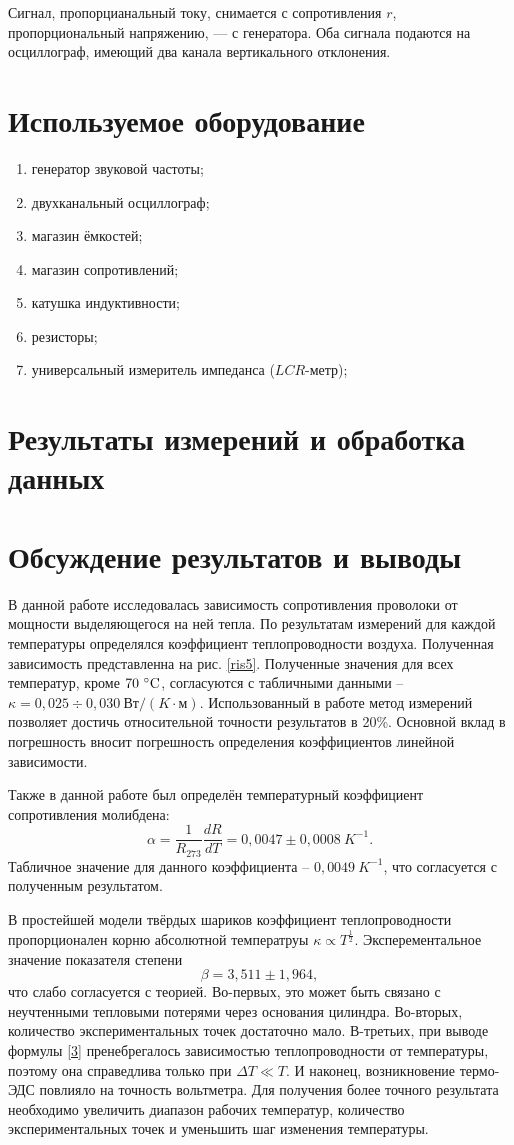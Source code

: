\documentclass[a4paper, 12pt]{article}
\begin{document}
Сигнал, пропорцианальный току, снимается с сопротивления $r$, пропорциональный напряжению, --- с генератора. Оба сигнала подаются на осциллограф, имеющий два канала вертикального отклонения.

\section{Используемое оборудование}

\begin{enumerate}
    \item генератор звуковой частоты;
    \item двухканальный осциллограф;
    \item магазин ёмкостей;
    \item магазин сопротивлений;
    \item катушка индуктивности;
    \item резисторы;
    \item универсальный измеритель импеданса ($LCR$-метр);
\end{enumerate}

\section{Результаты измерений и обработка данных}

\section{Обсуждение результатов и выводы}

В данной работе исследовалась зависимость сопротивления проволоки от мощности выделяющегося на ней тепла. По результатам измерений для каждой температуры определялся коэффициент теплопроводности воздуха. Полученная зависимость представленна на рис. \ref{ris5}. Полученные значения для всех температур, кроме $70~\celsius$, согласуются с табличными данными -- $\kappa = 0,025\div0,030~Вт/(K \cdot м)$.
Использованный в работе метод измерений позволяет достичь относительной точности результатов в 20\%. Основной вклад в погрешность вносит погрешность определения коэффициентов линейной зависимости.

Также в данной работе был определён температурный коэффициент сопротивления молибдена:
$$\boxed{\alpha = \frac{1}{R_{273}}\frac{dR}{dT} = 0,0047\pm0,0008~K^{-1}}.$$
Табличное значение для данного коэффициента -- $0,0049~K^{-1}$, что согласуется с полученным результатом.

В простейшей модели твёрдых шариков коэффициент теплопроводности пропорционален корню абсолютной температруы $\kappa \varpropto T^{\frac{1}{2}}$. Эксперементальное значение показателя степени $$\boxed{\beta = 3,511\pm1,964},$$ что слабо согласуется с теорией. Во-первых, это может быть связано с неучтенными тепловыми потерями через основания цилиндра. Во-вторых, количество экспериментальных точек достаточно мало. В-третьих, при выводе формулы \eqref{3} пренебрегалось зависимостью теплопроводности от температуры, поэтому она справедлива только при $\Delta T \ll T$. И наконец, возникновение термо-ЭДС повлияло на точность вольтметра. Для получения более точного результата необходимо увеличить диапазон рабочих температур, количество экспериментальных точек и уменьшить шаг изменения температуры.
\end{document}
